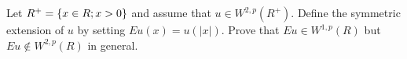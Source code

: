 Let $R^+ = \{ x \in R; x > 0 \}$ and assume that $u \in W^{2, p}(R^+)$.
Define the symmetric extension of $u$ by setting $Eu(x) = u(|x|)$.
Prove that $Eu \in W^{1, p}(R)$ but $Eu \notin W^{2, p}(R)$ in general.
